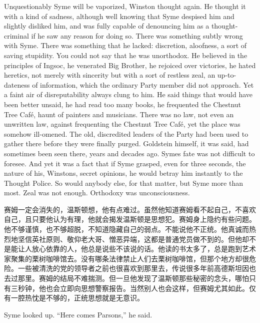 \begin{paracol}{2}
Unquestionably Syme will be vaporized, Winston thought again. He thought
it with a kind of sadness, although well knowing that Syme despised him
and slightly disliked him, and was fully capable of denouncing him as a
thought-criminal if he saw any reason for doing so. There was something
subtly wrong with Syme. There was something that he lacked: discretion,
aloofness, a sort of saving stupidity. You could not say that he was
unorthodox. He believed in the principles of Ingsoc, he venerated Big
Brother, he rejoiced over victories, he hated heretics, not merely with
sincerity but with a sort of restless zeal, an up-to-dateness of
information, which the ordinary Party member did not approach. Yet a
faint air of disreputability always clung to him. He said things that
would have been better unsaid, he had read too many books, he frequented
the Chestnut Tree Café, haunt of painters and musicians. There was no
law, not even an unwritten law, against frequenting the Chestnut Tree
Café, yet the place was somehow ill-omened. The old, discredited leaders
of the Party had been used to gather there before they were finally
purged. Goldstein himself, it was said, had sometimes been seen there,
years and decades ago. Syme\textquotesingle s fate was not difficult to
foresee. And yet it was a fact that if Syme grasped, even for three
seconds, the nature of his, Winston\textquotesingle s, secret opinions,
he would betray him instantly to the Thought Police. So would anybody
else, for that matter, but Syme more than most. Zeal was not enough.
Orthodoxy was unconsciousness.

\switchcolumn

赛姆一定会消失的，温斯顿想，他有点难过。虽然他知道赛姆看不起自己，不喜欢自己，且只要他认为有理，他就会揭发温斯顿是思想犯。赛姆身上隐约有些问题。他不够谨慎，也不够超脱，不知道隐藏自己的弱点。不能说他不正统。他真诚而热烈地坚信英社原则、敬仰老大哥、憎恶异端，这都是普通党员做不到的。但他却不是能让人放心依靠的人，他总是说些不该说的话。他读的书太多了，总是跑到艺术家聚集的栗树咖啡馆去。没有哪条法律禁止人们去栗树咖啡馆，但那个地方却很危险。一些被清洗的党的领导者之前也很喜欢到那里去，传说很多年前高德斯坦因也去过那里。赛姆的结局不难揣测。但一旦他发现了温斯顿那些秘密的念头，哪怕只有三秒钟，他也会立即向思想警察报告。当然别人也会这样，但赛姆尤其如此。仅有一腔热忱是不够的，正统思想就是无意识。

\switchcolumn*

Syme looked up. ``Here comes Parsons,'' he said.

\switchcolumn


\end{paracol}
